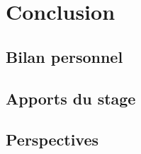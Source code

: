 \chapter{Conclusion}
    \lipsum[1-3]

\section{Bilan personnel}
    \lipsum[1-2]

\section{Apports du stage}
    \lipsum[1-2]

\section{Perspectives}
    \lipsum[1-2]
